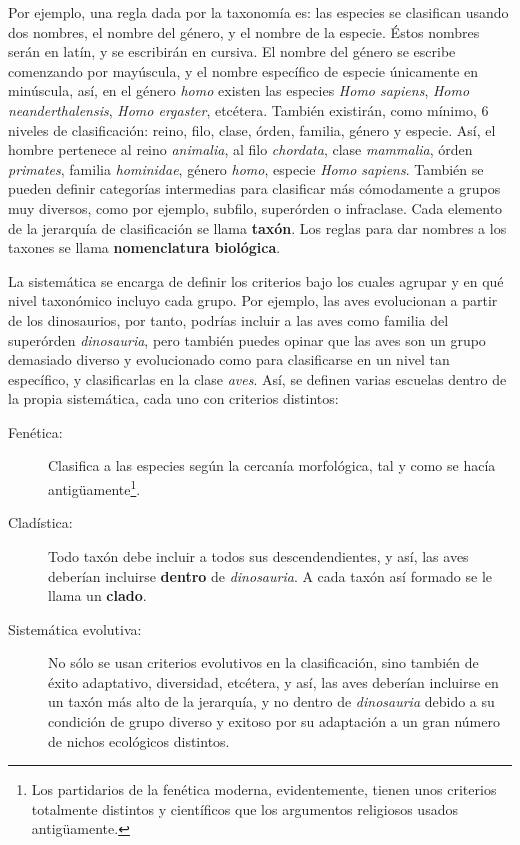 Por ejemplo, una regla dada por la taxonomía es: las especies se
clasifican usando dos nombres, el nombre del género, y el nombre de la
especie. Éstos nombres serán en latín, y se escribirán en
cursiva. El nombre del género se escribe comenzando por mayúscula, y
el nombre específico de especie únicamente en minúscula, así, en el
género \textit{homo} existen las especies \textit{Homo sapiens},
\textit{Homo   neanderthalensis}, \textit{Homo ergaster},
etcétera. También existirán, como mínimo, 6 niveles de clasificación:
reino, filo, clase, órden, familia, género y especie. Así, el hombre
pertenece al reino \textit{animalia}, al filo \textit{chordata}, clase
\textit{mammalia}, órden \textit{primates}, familia
\textit{hominidae}, género \textit{homo}, especie \textit{Homo
  sapiens}. También se pueden definir categorías intermedias para
clasificar más cómodamente a grupos muy diversos, como por ejemplo,
subfilo, superórden o infraclase. Cada elemento de la jerarquía de
clasificación se llama \textbf{taxón}. Los reglas para dar nombres a
los taxones se llama \textbf{nomenclatura biológica}.

La sistemática se encarga de definir los criterios bajo los cuales
agrupar y en qué nivel taxonómico incluyo cada grupo. Por ejemplo, las
aves evolucionan a partir de los dinosaurios, por tanto, podrías
incluir a las aves como familia del superórden \textit{dinosauria},
pero también puedes opinar que las aves son un grupo demasiado
diverso y evolucionado como para clasificarse en un nivel tan
específico, y clasificarlas en la clase \textit{aves}. Así, se definen
varias escuelas dentro de la propia sistemática, cada uno con
criterios distintos:

\begin{description}
\item[Fenética:] Clasifica a las especies según la cercanía
  morfológica, tal y como se hacía antigüamente\footnote{Los
    partidarios de la fenética moderna, evidentemente, tienen unos
    criterios totalmente distintos y científicos que los argumentos
    religiosos usados antigüamente.}.
\item[Cladística:] Todo taxón debe incluir a todos sus
  descendendientes, y así, las aves deberían incluirse \textbf{dentro}
  de \textit{dinosauria}. A cada taxón así formado se le llama un \textbf{clado}.
\item[Sistemática evolutiva:] No sólo se usan criterios evolutivos en
  la clasificación, sino también de éxito adaptativo, diversidad,
  etcétera, y así, las aves deberían incluirse en un taxón más alto de
  la jerarquía, y no dentro de \textit{dinosauria} debido a su
  condición de grupo diverso y exitoso por su adaptación a un gran
  número de nichos ecológicos distintos.
\end{description}

